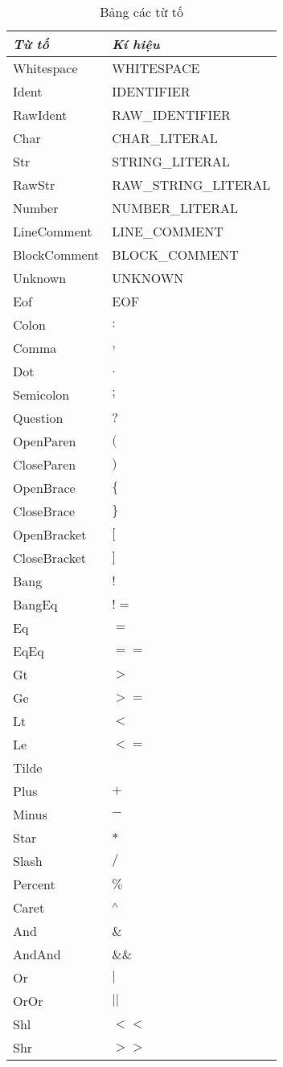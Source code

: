 \begin{longtable}{|p{4cm}| l |}
    \caption{Bảng các từ tố} \\
\hline
\textbf{\textit{Từ tố}} & \textbf{\textit{Kí hiệu}} \\
\hline
Whitespace & WHITESPACE \\
\hline
Ident & IDENTIFIER \\
\hline
RawIdent & RAW\_IDENTIFIER \\
\hline
Char & CHAR\_LITERAL \\
\hline
Str & STRING\_LITERAL \\
\hline
RawStr & RAW\_STRING\_LITERAL \\
\hline
Number & NUMBER\_LITERAL \\
\hline
LineComment & LINE\_COMMENT \\
\hline
BlockComment & BLOCK\_COMMENT \\
\hline
Unknown & UNKNOWN \\
\hline
Eof & EOF \\
\hline
Colon & $:$ \\
\hline
Comma & $,$ \\
\hline
Dot & $.$ \\
\hline
Semicolon & $;$ \\
\hline
Question & $?$ \\
\hline
OpenParen & $($ \\
\hline
CloseParen & $)$ \\
\hline
OpenBrace & $\{$ \\
\hline
CloseBrace & $\}$ \\
\hline
OpenBracket & $[$ \\
\hline
CloseBracket & $]$ \\
\hline
Bang & $!$ \\
\hline
BangEq & $!=$ \\
\hline
Eq & $=$ \\
\hline
EqEq & $==$ \\
\hline
Gt & $>$ \\
\hline
Ge & $>=$ \\
\hline
Lt & $<$ \\
\hline
Le & $<=$ \\
\hline
Tilde & $~$ \\
\hline
Plus & $+$ \\
\hline
Minus & $-$ \\
\hline
Star & $*$ \\
\hline
Slash & $/$ \\
\hline
Percent & $\%$ \\
\hline
Caret & $\textsuperscript{$\wedge$}$ \\
\hline
And & $\&$ \\
\hline
AndAnd & $\&\&$ \\
\hline
Or & $|$ \\
\hline
OrOr & $||$ \\
\hline
Shl & $<<$ \\
\hline
Shr & $>>$ \\
\hline
\end{longtable}
